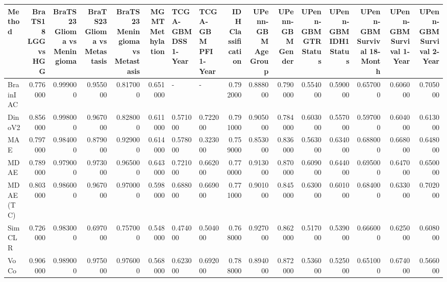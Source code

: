 \begin{tabular}{lrrrrrllrrrrrrrr}
\toprule
Method & BraTS18 LGG vs HGG & BraTS23 Glioma vs Meningioma & BraTS23 Glioma vs Metastasis & BraTS23 Meningioma vs Metastasis & MGMT Methylation & TCGA-GBM DSS 1-Year & TCGA-GBM PFI 1-Year & IDH Classification & UPenn-GBM Age Group & UPenn-GBM Gender & UPenn-GBM GTR Status & UPenn-GBM IDH1 Status & UPenn-GBM Survival 18-Month & UPenn-GBM Survival 1-Year & UPenn-GBM Survival 2-Year \\
\midrule
BrainIAC & 0.776000 & 0.999000 & 0.955000 & 0.817000 & 0.651000 & - & - & 0.792000 & 0.888000 & 0.790000 & 0.554000 & 0.590000 & 0.657000 & 0.606000 & 0.705000 \\
DinoV2 & 0.856000 & 0.998000 & 0.967000 & 0.828000 & 0.611000 & 0.571000 & 0.722000 & 0.791000 & 0.905000 & 0.784000 & 0.603000 & 0.557000 & 0.597000 & 0.604000 & 0.613000 \\
MAE & 0.797000 & 0.984000 & 0.879000 & 0.929000 & 0.614000 & 0.578000 & 0.323000 & 0.759000 & 0.853000 & 0.836000 & 0.563000 & 0.634000 & 0.688000 & 0.668000 & 0.648000 \\
MDAE & 0.789000 & 0.979000 & 0.973000 & 0.965000 & 0.643000 & 0.721000 & 0.662000 & 0.770000 & 0.913000 & 0.870000 & 0.609000 & 0.644000 & 0.695000 & 0.647000 & 0.650000 \\
MDAE (TC) & 0.803000 & 0.986000 & 0.967000 & 0.970000 & 0.598000 & 0.688000 & 0.669000 & 0.771000 & 0.901000 & 0.845000 & 0.630000 & 0.601000 & 0.684000 & 0.633000 & 0.702000 \\
SimCLR & 0.726000 & 0.983000 & 0.697000 & 0.757000 & 0.548000 & 0.474000 & 0.504000 & 0.768000 & 0.927000 & 0.862000 & 0.517000 & 0.539000 & 0.666000 & 0.625000 & 0.608000 \\
VoCo & 0.906000 & 0.989000 & 0.975000 & 0.976000 & 0.568000 & 0.623000 & 0.692000 & 0.788000 & 0.894000 & 0.872000 & 0.536000 & 0.525000 & 0.651000 & 0.674000 & 0.566000 \\
\bottomrule
\end{tabular}
